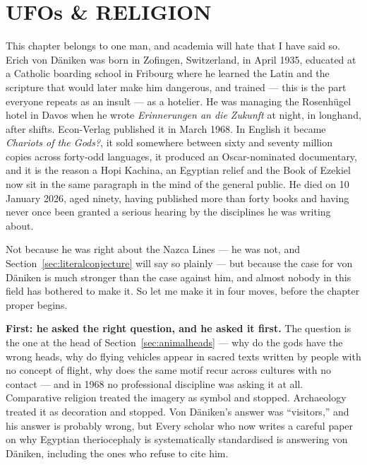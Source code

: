 \chapter{UFOs \& RELIGION}\label{ch:religion}


This chapter belongs to one man, and academia will hate that I have said so. Erich von Däniken
was born in Zofingen, Switzerland, in April 1935, educated at a Catholic boarding school in
Fribourg where he learned the Latin and the scripture that would later make him dangerous, and
trained --- this is the part everyone repeats as an insult --- as a hotelier. He was managing the
Rosenhügel hotel in Davos when he wrote \emph{Erinnerungen an die Zukunft} at night, in longhand,
after shifts. Econ-Verlag published it in March 1968. In English it became
\emph{Chariots of the Gods?}, it sold somewhere between sixty and seventy million copies across
forty-odd languages, it produced an Oscar-nominated documentary, and it is the reason a Hopi
Kachina, an Egyptian relief and the Book of Ezekiel now sit in the same paragraph in the mind of
the general public. He died on 10 January 2026, aged ninety, having published more than forty
books and having never once been granted a serious hearing by the disciplines he was writing
about.

 Not because he was right about the Nazca Lines --- he was not,
and Section~\ref{sec:literalconjecture} will say so plainly --- but because the case for von
Däniken is much stronger than the case against him, and almost nobody in this field has bothered
to make it. So let me make it in four moves, before the chapter proper begins.

\textbf{First: he asked the right question, and he asked it first.} The question is the one at the
head of Section~\ref{sec:animalheads} --- why do the gods have the wrong heads, why do flying
vehicles appear in sacred texts written by people with no concept of flight, why does the same
motif recur across cultures with no contact --- and in 1968 no professional discipline was asking
it at all. Comparative religion treated the imagery as symbol and stopped. Archaeology treated it
as decoration and stopped. Von Däniken's answer was ``visitors,'' and his answer is probably
wrong, but  Every scholar who now writes a careful paper on why Egyptian
theriocephaly is systematically standardised is answering von Däniken, including the ones who
refuse to cite him.


